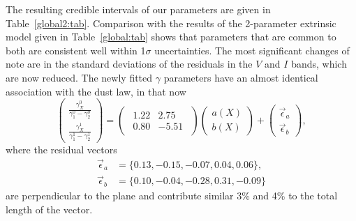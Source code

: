\documentclass{aastex61}   	%
\begin{document}
The resulting credible intervals of our parameters are given in Table~\ref{global2:tab}.  Comparison with the
results of the 2-parameter extrinsic model given in Table~\ref{global:tab} shows that  parameters that are common to both
are consistent well within 1$\sigma$ uncertainties.  The most significant changes of note are in the standard
deviations of the residuals in the $V$ and $I$ bands, which are now reduced.
The newly fitted $\gamma$ parameters have an almost identical association with the   dust law, in that now
\begin{equation}
\begin{pmatrix}
 \frac{\gamma^0_X}{\gamma^0_1-\gamma^0_2} \\
\frac{\gamma^1_X}{\gamma^1_1-\gamma^1_2} 
\end{pmatrix}=
\begin{pmatrix}
\begin{array}{rr}
1.22 & 2.75 \\
0.80 & -5.51
\end{array}
\end{pmatrix} 
\begin{pmatrix}
a(X) \\
b(X)
\end{pmatrix}+
\begin{pmatrix}
\vec{\epsilon}_a \\
\vec{\epsilon}_b
\end{pmatrix},
\end{equation}
where the residual vectors 
\color{red}
\begin{align}
\vec{\epsilon}_a &=\{0.13, -0.15, -0.07,  0.04,  0.06\},\\
\vec{\epsilon}_b &=\{ 0.10, -0.04,  -0.28,  0.31, -0.09\}
\end{align}
\color{black}
are perpendicular to the   plane and
contribute similar 3\% and 4\% to the total  length of the vector.
\end{document}
